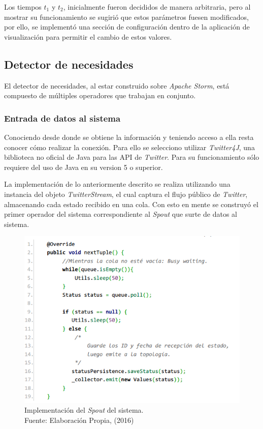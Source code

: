 Los tiempos $t_{1}$ y $t_{2}$, inicialmente fueron decididos de manera arbitraria, pero al mostrar su funcionamiento se sugirió que estos parámetros fuesen modificados, por ello, se implementó una sección de configuración dentro de la aplicación de visualización para permitir el cambio de estos valores.

\subsection{Detector de necesidades}
\label{subsec:detectorNecesidades}

El detector de necesidades, al estar construido sobre \textit{Apache Storm}, está compuesto de múltiples operadores que trabajan en conjunto.

\subsubsection*{Entrada de datos al sistema}
\label{subsubseC:EntradaDeDatos}

Conociendo desde donde se obtiene la información y teniendo acceso a ella resta conocer cómo realizar la conexión. Para ello se selecciono utilizar \textit{Twitter4J}, una biblioteca no oficial de Java para las API de \textit{Twitter}. Para su funcionamiento sólo requiere del uso de Java en su version 5 o superior.

La implementación de lo anteriormente descrito se realiza utilizando una instancia del objeto \textit{TwitterStream}, el cual captura el flujo público de \textit{Twitter}, almacenando cada estado recibido en una cola. Con esto en mente se construyó el primer operador del sistema correspondiente al \textit{Spout} que surte de datos al sistema.

\begin{figure}[H]
	\centering
	\captionsetup{justification=centering}
	\includegraphics[scale=0.8]{images/TwitterSpout.png}
	\caption[Implementación del \textit{Spout} del sistema.]{Implementación del \textit{Spout} del sistema.\\Fuente: Elaboración Propia, (2016)}
	\label{fig:TwitterSpout}
\end{figure}

